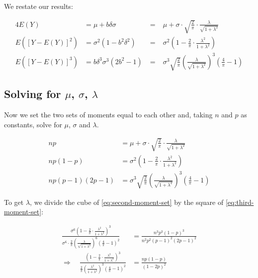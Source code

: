 \documentclass{article}
\begin{document}
We restate our results:

\begin{alignat}{4}
  E(Y) &= \mu + b \delta \sigma \;&=&\; \mu + \sigma \cdot \sqrt{\frac{2}{\pi}} \cdot \frac{\lambda}{\sqrt{1 + \lambda^2}} \nonumber \\
  E([Y - E(Y)]^2) &= \sigma^2 (1 - b^2 \delta^2) \;&=&\; \sigma^2 \left( 1 - \frac{2}{\pi} \cdot \frac{\lambda^2}{1 + \lambda^2} \right) \\
  E([Y - E(Y)]^3) &= b \delta^3 \sigma^3 (2b^2 - 1) \;&=&\; \sigma^3 \sqrt{\frac{2}{\pi}} \left( \frac{\lambda}{\sqrt{1 + \lambda^2}} \right)^3 \left( \frac{4}{\pi} - 1 \right) \nonumber
\end{alignat}

\subsection{Solving for $\mu$, $\sigma$, $\lambda$}

Now we set the two sets of moments equal to each other and, taking $n$ and $p$
as constants, solve for $\mu$, $\sigma$ and $\lambda$.

\begin{subequations}
\begin{align}
  np &= \mu + \sigma \cdot \sqrt{\frac{2}{\pi}} \cdot \frac{\lambda}{\sqrt{1 + \lambda^2}} \label{eq:first-moment-set} \\
  np(1-p) &= \sigma^2 \left( 1 - \frac{2}{\pi} \cdot \frac{\lambda^2}{1 + \lambda^2} \right) \label{eq:second-moment-set} \\
  np(p-1)(2p-1) &= \sigma^3 \sqrt{\frac{2}{\pi}} \left( \frac{\lambda}{\sqrt{1 + \lambda^2}} \right)^3 \left( \frac{4}{\pi} - 1 \right) \label{eq:third-moment-set}
\end{align}
\end{subequations}

To get $\lambda$, we divide the cube of \eqref{eq:second-moment-set} by the
square of \eqref{eq:third-moment-set}:

\begin{align}
  \frac{\sigma^6 \left( 1 - \frac{2}{\pi} \cdot \frac{\lambda^2}{1 + \lambda^2} \right)^3}{\sigma^6 \cdot \frac{2}{\pi} \left( \frac{\lambda}{\sqrt{1 + \lambda^2}} \right)^6 \left(
    \frac{4}{\pi} - 1 \right)^2} &= \frac{n^3p^3(1-p)^3}{n^2p^2(p-1)^2(2p-1)^2} \nonumber \\
  \Rightarrow \quad \frac{\left( 1 - \frac{2}{\pi} \cdot \frac{\lambda^2}{1+\lambda^2} \right)^3}{\frac{2}{\pi} \left( \frac{\lambda^2}{1+\lambda^2} \right)^3 \left( \frac{4}{\pi} - 1
    \right)^2} &= \frac{np(1-p)}{(1-2p)^2} \label{eq:solving-for-lambda}
\end{align}
\end{document}
